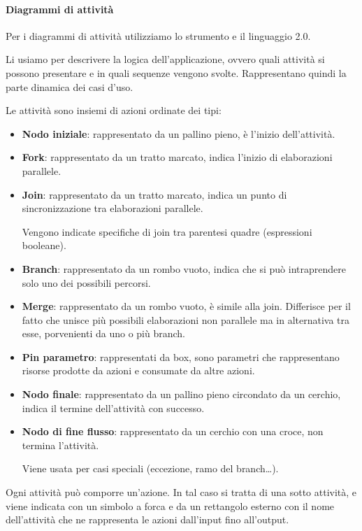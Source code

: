 		\paragraph{Diagrammi di attività}\label{PP:Sviluppo:DiagrammiAttività}
        Per i diagrammi di attività utilizziamo lo strumento  e il linguaggio  2.0.\par
		Li usiamo per descrivere la logica dell'applicazione, ovvero quali attività si possono presentare e in quali sequenze vengono svolte. Rappresentano quindi la parte dinamica dei casi d'uso.\par
        Le attività sono insiemi di azioni ordinate dei tipi:
        \begin{itemize}
            \item \textbf{Nodo iniziale}: rappresentato da un pallino pieno, è l'inizio dell'attività.
            \item \textbf{Fork}: rappresentato da un tratto marcato, indica l'inizio di elaborazioni parallele.
            \item \textbf{Join}: rappresentato da un tratto marcato, indica un punto di sincronizzazione tra elaborazioni parallele.\par
                Vengono indicate specifiche di join tra parentesi quadre (espressioni booleane).
            \item \textbf{Branch}: rappresentato da un rombo vuoto, indica che si può intraprendere solo uno dei possibili percorsi.
            \item \textbf{Merge}: rappresentato da un rombo vuoto, è simile alla join. Differisce per il fatto che unisce più possibili elaborazioni non parallele ma in alternativa tra esse, porvenienti da uno o più branch.
            \item \textbf{Pin parametro}: rappresentati da box, sono parametri che rappresentano risorse prodotte da azioni e consumate da altre azioni.
            \item \textbf{Nodo finale}: rappresentato da un pallino pieno circondato da un cerchio, indica il termine dell'attività con successo.
            \item \textbf{Nodo di fine flusso}: rappresentato da un cerchio con una croce, non termina l'attività.\par
                Viene usata per casi speciali (eccezione, ramo del branch\dots).
        \end{itemize}
        Ogni attività può comporre un'azione. In tal caso si tratta di una sotto attività, e viene indicata con un simbolo a forca e da un rettangolo esterno con il nome dell'attività che ne rappresenta le azioni dall'input fino all'output.\par
